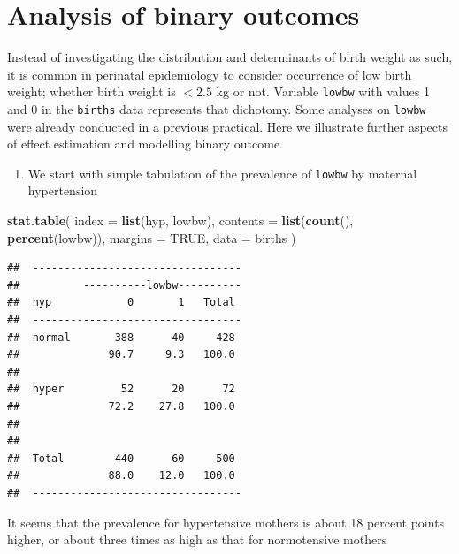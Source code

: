 \documentclass[
]{book}
\newenvironment{Shaded}{\begin{snugshade}}{\end{snugshade}}
\newcommand{\AttributeTok}[1]{\textcolor[rgb]{0.13,0.29,0.53}{#1}}
\newcommand{\ConstantTok}[1]{\textcolor[rgb]{0.56,0.35,0.01}{#1}}
\newcommand{\FunctionTok}[1]{\textcolor[rgb]{0.13,0.29,0.53}{\textbf{#1}}}
\newcommand{\NormalTok}[1]{#1}
\providecommand{\tightlist}{%
  \setlength{\itemsep}{0pt}\setlength{\parskip}{0pt}}
\begin{document}
\section{Analysis of binary outcomes}\label{analysis-of-binary-outcomes}

Instead of investigating the distribution and determinants
of birth weight as such, it is common in perinatal
epidemiology to consider
occurrence of low birth weight; whether birth weight is
\(< 2.5\) kg or not. Variable \texttt{lowbw} with values 1 and 0
in the \texttt{births} data represents that dichotomy.
Some analyses on \texttt{lowbw} were already conducted
in a previous practical. Here we illustrate further
aspects of effect estimation
and modelling binary outcome.

\begin{enumerate}
\def\labelenumi{\arabic{enumi}.}
\tightlist
\item
  We start with simple tabulation
  of the prevalence of \texttt{lowbw} by maternal hypertension
\end{enumerate}

\begin{Shaded}
\begin{Highlighting}[]
\FunctionTok{stat.table}\NormalTok{(}
  \AttributeTok{index =} \FunctionTok{list}\NormalTok{(hyp, lowbw),}
  \AttributeTok{contents =} \FunctionTok{list}\NormalTok{(}\FunctionTok{count}\NormalTok{(), }\FunctionTok{percent}\NormalTok{(lowbw)),}
  \AttributeTok{margins =} \ConstantTok{TRUE}\NormalTok{, }\AttributeTok{data =}\NormalTok{ births}
\NormalTok{)}
\end{Highlighting}
\end{Shaded}

\begin{verbatim}
##  --------------------------------- 
##          ----------lowbw---------- 
##  hyp            0       1   Total  
##  --------------------------------- 
##  normal       388      40     428  
##              90.7     9.3   100.0  
##                                    
##  hyper         52      20      72  
##              72.2    27.8   100.0  
##                                    
##                                    
##  Total        440      60     500  
##              88.0    12.0   100.0  
##  ---------------------------------
\end{verbatim}

It seems that the prevalence for hypertensive mothers
is about 18 percent points higher,
or about three times as high as that for normotensive mothers
\end{document}
